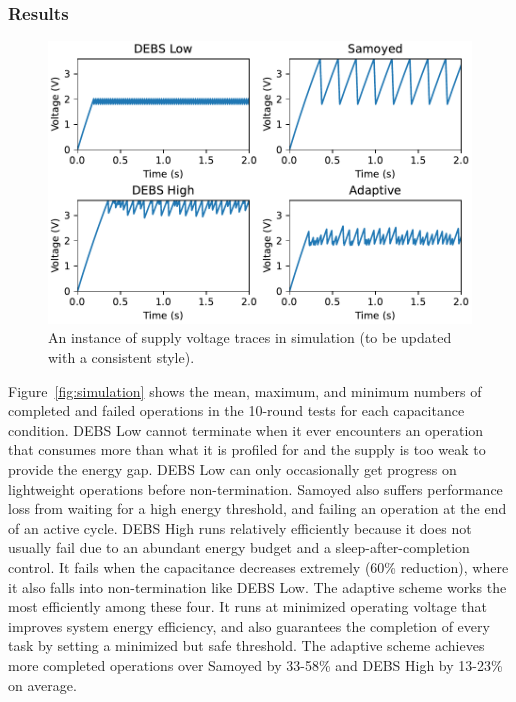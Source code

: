 \subsubsection{Results}

% 
% 



\begin{figure}[!t]
    \centering
    \includegraphics[width=\columnwidth]{ch5_optic/figures/voltage_traces.pdf}
    \caption{An instance of supply voltage traces in simulation (to be updated with a consistent style). }
    \label{fig:simulation_voltage}
\end{figure}



Figure~\ref{fig:simulation} shows the mean, maximum, and minimum numbers of completed and failed operations in the 10-round tests for each capacitance condition. 
DEBS Low cannot terminate when it ever encounters an operation that consumes more than what it is profiled for and the supply is too weak to provide the energy gap. 
DEBS Low can only occasionally get progress on lightweight operations before non-termination. 
Samoyed also suffers performance loss from waiting for a high energy threshold, and failing an operation at the end of an active cycle. 
DEBS High runs relatively efficiently because it does not usually fail due to an abundant energy budget and a sleep-after-completion control. 
It fails when the capacitance decreases extremely (60\% reduction), where it also falls into non-termination like DEBS Low.  
The adaptive scheme works the most efficiently among these four.
It runs at minimized operating voltage that improves system energy efficiency, and also guarantees the completion of every task by setting a minimized but safe threshold.
The adaptive scheme achieves more completed operations over Samoyed by 33-58\% and DEBS High by 13-23\% on average.

